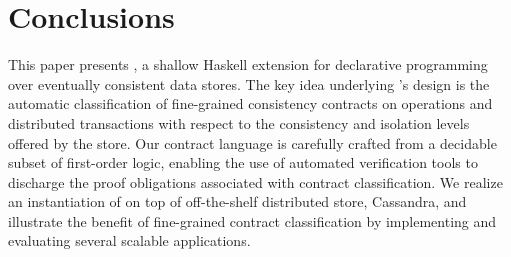 \section{Conclusions}
\label{sec:concl}

This paper presents \name, a shallow Haskell extension for declarative
programming over eventually consistent data stores. The key idea underlying
\name's design is the automatic classification of fine-grained consistency
contracts on operations and distributed transactions with respect to the
consistency and isolation levels offered by the store. Our contract language
is carefully crafted from a decidable subset of first-order logic, enabling
the use of automated verification tools to discharge the proof obligations
associated with contract classification. We realize an instantiation of
\name on top of off-the-shelf distributed store, Cassandra, and illustrate
the benefit of fine-grained contract classification by implementing and
evaluating several scalable applications.

